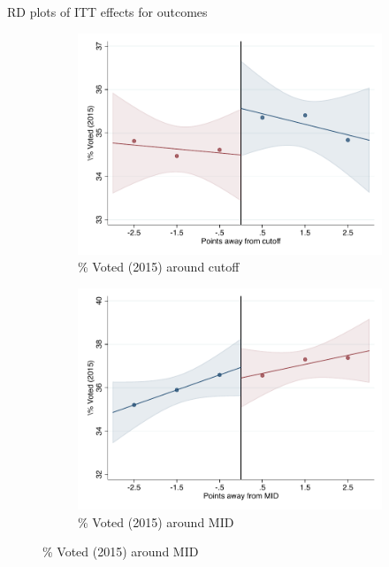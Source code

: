 \documentclass[notes,11pt, aspectratio=169]{beamer}
\begin{document}
\begin{frame}{RD plots of ITT effects for outcomes}
\hyperlink{ITT_rd_plot_IPN}{}
\begin{figure}

    \begin{subfigure}{0.45\textwidth}
        \centering
        \caption{\% Voted (2015) around cutoff}
        \includegraphics[width=\textwidth]{04_Figures/rd_plot_tau_Voto_Marcado_2015_IPN3.pdf}
    \end{subfigure}
    \begin{subfigure}{0.45\textwidth}
        \centering
        \caption{\% Voted (2015) around MID}
        \includegraphics[width=\textwidth]{04_Figures/rd_plot_mid_Voto_Marcado_2015_IPN3.pdf}
    \end{subfigure}
    
\end{figure}
\end{frame}
\end{document}
